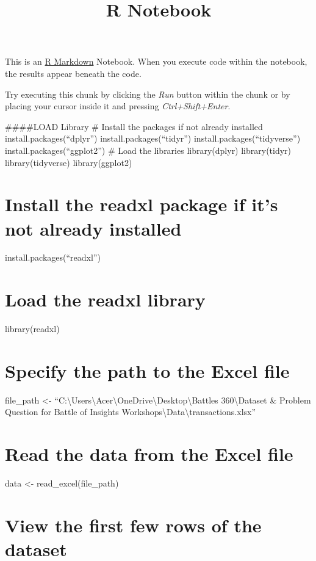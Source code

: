 \documentclass[
]{article}
\title{R Notebook}
\author{}
\date{\vspace{-2.5em}}
\begin{document}
\maketitle

This is an \href{http://rmarkdown.rstudio.com}{R Markdown} Notebook.
When you execute code within the notebook, the results appear beneath
the code.

Try executing this chunk by clicking the \emph{Run} button within the
chunk or by placing your cursor inside it and pressing
\emph{Ctrl+Shift+Enter}.

\#\#\#\#LOAD Library \# Install the packages if not already installed
install.packages(``dplyr'') install.packages(``tidyr'')
install.packages(``tidyverse'') install.packages(``ggplot2'') \# Load
the libraries library(dplyr) library(tidyr) library(tidyverse)
library(ggplot2)

\section{Install the readxl package if it's not already
installed}\label{install-the-readxl-package-if-its-not-already-installed}

install.packages(``readxl'')

\section{Load the readxl library}\label{load-the-readxl-library}

library(readxl)

\section{Specify the path to the Excel
file}\label{specify-the-path-to-the-excel-file}

file\_path \textless-
``C:\textbackslash Users\textbackslash Acer\textbackslash OneDrive\textbackslash Desktop\textbackslash Battles
360\textbackslash Dataset \& Problem Question for Battle of Insights
Workshops\textbackslash Data\textbackslash transactions.xlsx''

\section{Read the data from the Excel
file}\label{read-the-data-from-the-excel-file}

data \textless- read\_excel(file\_path)

\section{View the first few rows of the
dataset}\label{view-the-first-few-rows-of-the-dataset}
\end{document}
